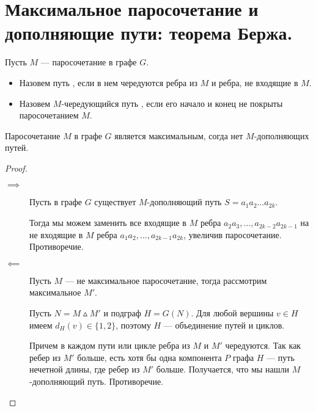 \section{Максимальное паросочетание и дополняющие пути: теорема Бержа.}
\begin{definition}
    Пусть $M$ --- паросочетание в графе $G$.
	\begin{itemize}
		\item Назовем путь , если в нем чередуются ребра из $M$ и ребра, не входящие в  $M$.
		\item Назовем $M$-чередующийся путь , если его начало и конец не покрыты паросочетанием $M$.
	\end{itemize}
\end{definition}

\begin{theorem}[Берж, 1957]
    Паросочетание $M$ в графе $G$ является максимальным, согда нет $M$-дополняющих путей.
\end{theorem}
\begin{proof}
    \begin{description}
		\item[$ \implies$ ] Пусть в графе  $G$ существует $M$-дополняющий путь $S = a_1a_2\ldots a_{2k}$.

			Тогда мы можем заменить все входящие в $M$ ребра $a_2a_3, \ldots , a_{2k-2}a_{2k-1}$ на не входящие в $M$ ребра $a_1a_2, \ldots , a_{2k-1}a_{2k}$, увеличив паросочетание. Противоречие. 
		\item[$ \impliedby$] Пусть $M$ --- не максимальное паросочетание, тогда рассмотрим максимальное $M'$.

		Пусть $N = M \vartriangle M'$ и подграф $H = G(N)$. Для любой вершины $v \in  H$ имеем $d_H(v) \in \{1, 2\}$, поэтому $H$ --- объединение путей и циклов. 

		Причем в каждом пути или цикле ребра из $M$ и $M'$ чередуются. Так как ребер из $M'$ больше, есть хотя бы одна компонента $P$ графа $H$ --- путь нечетной длины, где ребер из $M'$ больше. Получается, что мы нашли $M$-дополняющий путь. Противоречие.
    \end{description}
\end{proof}

